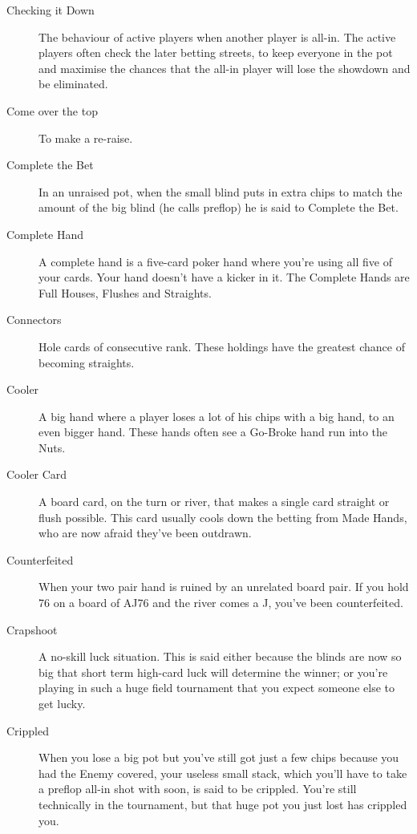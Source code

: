 \begin{description}
\item[Checking it Down] The behaviour of active players when another
player is all-in. The active players often check the later betting
streets, to keep everyone in the pot and maximise the chances that the
all-in player will lose the showdown and be eliminated.

\item[Come over the top] To make a re-raise.

\item[Complete the Bet] In an unraised pot, when the small blind puts
in extra chips to match the amount of the big blind (he calls preflop)
he is said to Complete the Bet.

\item[Complete Hand] A complete hand is a five-card poker hand where
you're using all five of your cards. Your hand doesn't have a kicker
in it. The Complete Hands are Full Houses, Flushes and Straights.

\item[Connectors] Hole cards of consecutive rank. These holdings have
the greatest chance of becoming straights.

\item[Cooler] A big hand where a player loses a lot of his chips with
a big hand, to an even bigger hand. These hands often see a Go-Broke
hand run into the Nuts.

\item[Cooler Card] A board card, on the turn or river, that makes a
single card straight or flush possible. This card usually cools down
the betting from Made Hands, who are now afraid they've been outdrawn.

\item[Counterfeited] When your two pair hand is ruined by an unrelated
board pair. If you hold 76 on a board of AJ76 and the river comes a J,
you've been counterfeited.

\item[Crapshoot] A no-skill luck situation. This is said either
because the blinds are now so big that short term high-card luck will
determine the winner; or you're playing in such a huge field
tournament that you expect someone else to get lucky.

\item[Crippled] When you lose a big pot but you've still got just a
few chips because you had the Enemy covered, your useless small stack,
which you'll have to take a preflop all-in shot with soon, is said to
be crippled. You're still technically in the tournament, but that huge
pot you just lost has crippled you.


\end{description}
